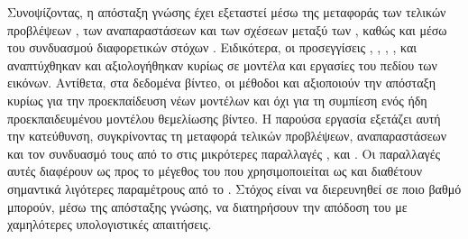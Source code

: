 Συνοψίζοντας, η απόσταξη γνώσης έχει εξεταστεί μέσω της μεταφοράς των
τελικών προβλέψεων \cite{touvron2021deit,beyer2022knowledge}, των
αναπαραστάσεων και των σχέσεων μεταξύ των 
\cite{yang2024vitkd,ren2023tinymim,oquab2023dinov2}, καθώς και μέσω του
συνδυασμού διαφορετικών στόχων \cite{huang2023generic}. Ειδικότερα, οι
προσεγγίσεις , , , ,
 και  αναπτύχθηκαν και αξιολογήθηκαν κυρίως σε
μοντέλα και εργασίες του πεδίου των εικόνων. Αντίθετα, στα δεδομένα
βίντεο, οι μέθοδοι  και  αξιοποιούν την απόσταξη κυρίως
για την προεκπαίδευση νέων μοντέλων και όχι για τη συμπίεση ενός ήδη
προεκπαιδευμένου μοντέλου θεμελίωσης βίντεο. Η παρούσα εργασία εξετάζει αυτή την κατεύθυνση, συγκρίνοντας τη μεταφορά
τελικών προβλέψεων, αναπαραστάσεων και τον συνδυασμό τους από το
 στις μικρότερες παραλλαγές ,  και
.  Οι παραλλαγές αυτές διαφέρουν ως προς το μέγεθος του  που
χρησιμοποιείται ως  και διαθέτουν σημαντικά λιγότερες
παραμέτρους από το . Στόχος είναι να διερευνηθεί σε
ποιο βαθμό μπορούν, μέσω της απόσταξης γνώσης, να διατηρήσουν την
απόδοση του  με χαμηλότερες υπολογιστικές απαιτήσεις.